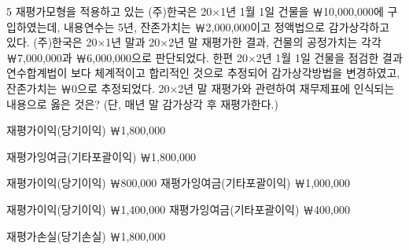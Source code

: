 \begin{question}{5}
재평가모형을 적용하고 있는 (주)한국은 20×1년 1월 1일 건물을 ￦10,000,000에 구입하였는데, 내용연수는 5년, 잔존가치는 ￦2,000,000이고 정액법으로 감가상각하고 있다. (주)한국은 20×1년 말과 20×2년 말 재평가한 결과, 건물의 공정가치는 각각 ￦7,000,000과 ￦6,000,000으로 판단되었다. 한편 20×2년 1월 1일 건물을 점검한 결과 연수합계법이 보다 체계적이고 합리적인 것으로 추정되어 감가상각방법을 변경하였고, 잔존가치는 ￦0으로 추정되었다. 20×2년 말 재평가와 관련하여 재무제표에 인식되는 내용으로 옳은 것은? (단, 매년 말 감가상각 후 재평가한다.)
\begin{choices}
  \item 재평가이익(당기이익) ￦1,800,000
  \item 재평가잉여금(기타포괄이익) ￦1,800,000
  \item 재평가이익(당기이익) ￦800,000 재평가잉여금(기타포괄이익) ￦1,000,000
  \item 재평가이익(당기이익) ￦1,400,000 재평가잉여금(기타포괄이익) ￦400,000
  \item 재평가손실(당기손실) ￦1,800,000
\end{choices}
\end{question}
